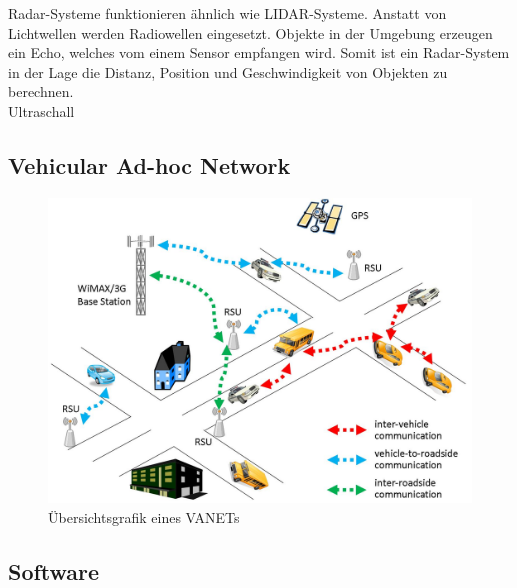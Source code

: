 Radar-Systeme \cite{introductionToRadarSystems} funktionieren ähnlich wie LIDAR-Systeme. Anstatt von Lichtwellen werden Radiowellen eingesetzt. Objekte in der Umgebung erzeugen ein Echo, welches vom einem Sensor empfangen wird. Somit ist ein Radar-System in der Lage die Distanz, Position und Geschwindigkeit von Objekten zu berechnen.\\

Ultraschall\\


\subsection{Vehicular Ad-hoc Network}

\begin{figure}[H]
    \centering
    \includegraphics[width=.485\textwidth]{resources/images/vanet.jpg}
    \caption{Übersichtsgrafik eines VANETs \cite{vanet}}
\end{figure}

\subsection{Software}
